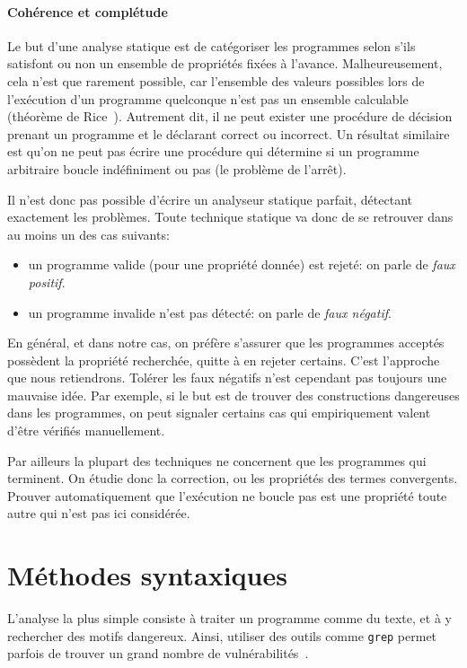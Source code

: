 \paragraph{Cohérence et complétude}

Le but d'une analyse statique est de catégoriser les programmes selon s'ils
satisfont ou non un ensemble de propriétés fixées à l'avance. Malheureusement,
cela n'est que rarement possible, car l'ensemble des valeurs possibles lors de
l'exécution d'un programme quelconque n'est pas un ensemble calculable (théorème
de Rice~\cite{rice}). Autrement dit, il ne peut exister une procédure de
décision prenant un programme et le déclarant correct ou incorrect. Un résultat
similaire est qu'on ne peut pas écrire une procédure qui détermine si un
programme arbitraire boucle indéfiniment ou pas (le problème de l'arrêt).

Il n'est donc pas possible d'écrire un analyseur statique parfait, détectant
exactement les problèmes. Toute technique statique va donc de se retrouver dans
au moins un des cas suivants:

\begin{itemize}
\item
  un programme valide (pour une propriété donnée) est rejeté: on parle de
  \emph{faux positif}.
\item
  un programme invalide n'est pas détecté: on parle de
  \emph{faux négatif}.
\end{itemize}

En général, et dans notre cas, on préfère s'assurer que les programmes acceptés
possèdent la propriété recherchée, quitte à en rejeter certains. C'est
l'approche que nous retiendrons. Tolérer les faux négatifs n'est cependant pas
toujours une mauvaise idée. Par exemple, si le but est de trouver des
constructions dangereuses dans les programmes, on peut signaler certains cas qui
empiriquement valent d'être vérifiés manuellement.

Par ailleurs la plupart des techniques ne concernent que les programmes qui
terminent. On étudie donc la correction, ou les propriétés des termes
convergents. Prouver automatiquement que l'exécution ne boucle pas est une
propriété toute autre qui n'est pas ici considérée.

\section{Méthodes syntaxiques}

L'analyse la plus simple consiste à traiter un programme comme du texte, et à y
rechercher des motifs dangereux. Ainsi, utiliser des outils comme \texttt{grep}
permet parfois de trouver un grand nombre de vulnérabilités~\cite{SpenderGrep}.

